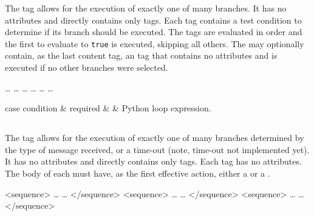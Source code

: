 The  tag allows for the execution of exactly one of
many branches. It has no attributes and directly contains only
 tags.  Each  tag contains a test condition
to determine if its branch should be executed.  The 
tags are evaluated in order and the first to evaluate to
\verb|true| is executed, skipping all others.  The 
may optionally contain, as the last content tag, an  tag
that contains no attributes and is executed if no other branches
were selected.

\begin{codelisting}
        \dots
        \dots
        \dots
        \dots
        \dots
        \dots
\end{codelisting}

\begin{attrDefs}{case}
condition	&	required	&			& Python loop expression. \\
\end{attrDefs}

\subsection{}

The  tag allows for the execution of exactly one
of many branches determined by the type of message received,
or a time-out (note, time-out not implemented yet).  It has
no attributes and directly contains only  tags.
Each  tag has no attributes.  The body of each
 must have, as the first effective action, 
either a  or a .

\begin{codelisting}
        <sequence>
            \dots
            \dots
        </sequence>
        <sequence>
            \dots
            \dots
        </sequence>
        <sequence>
            \dots
            \dots
        </sequence>
\end{codelisting}


